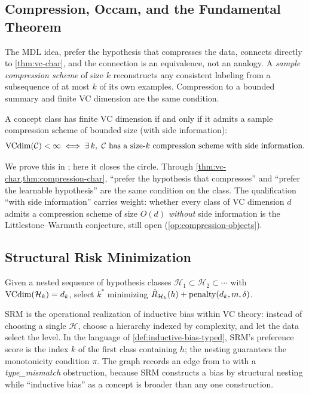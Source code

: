 \subsection{Compression, Occam, and the Fundamental Theorem}

The MDL idea, prefer the hypothesis that compresses the data, connects directly to \cref{thm:vc-char}, and the connection is an equivalence, not an analogy. A \emph{sample compression scheme} of size $k$ reconstructs any consistent labeling from a subsequence of at most $k$ of its own examples. Compression to a bounded summary and finite VC dimension are the same condition.

\begin{thm}
\label{thm:compression-char}
A concept class has finite VC dimension if and only if it admits a sample compression scheme of bounded size (with side information):
\[
\VC(\mathcal{C}) < \infty \iff \exists\, k,\ \mathcal{C} \text{ has a size-}k\text{ compression scheme with side information.}
\]
\end{thm}

We prove this in ; here it closes the circle. Through \cref{thm:vc-char,thm:compression-char}, ``prefer the hypothesis that compresses'' and ``prefer the learnable hypothesis'' are the same condition on the class. The qualification ``with side information'' carries weight: whether every class of VC dimension $d$ admits a compression scheme of size $O(d)$ \emph{without} side information is the Littlestone--Warmuth conjecture, still open (\cref{op:compression-objects}).

\subsection{Structural Risk Minimization}

\begin{defn}
\label{def:srm}
Given a nested sequence of hypothesis classes $\mathcal{H}_1 \subset \mathcal{H}_2 \subset \cdots$ with $\mathrm{VCdim}(\mathcal{H}_k) = d_k$, select $k^\ast$ minimizing $\hat{R}_{\mathcal{H}_k}(h) + \mathrm{penalty}(d_k, m, \delta)$.
\end{defn}

SRM is the operational realization of inductive bias within VC theory: instead of choosing a single $\mathcal{H}$, choose a hierarchy indexed by complexity, and let the data select the level. In the language of \cref{def:inductive-bias-typed}, SRM's preference score is the index $k$ of the first class containing $h$; the nesting guarantees the monotonicity condition $\pi$. The graph records an  edge from  to  with a \emph{type\_mismatch} obstruction, because SRM constructs a bias by structural nesting while ``inductive bias'' as a concept is broader than any one construction.

